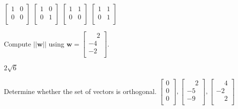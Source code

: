 \documentclass[11pt]{exam}
\begin{document}
\begin{questions}
\begin{oneparchoices}
\choice $\left[\begin{array}{cc}1 & 0 \\ 0 & 0 \\ \end{array}\right]$
\choice $\left[\begin{array}{cc}1 & 0 \\ 0 & 1 \\ \end{array}\right]$
\choice $\left[\begin{array}{cc}1 & 1 \\ 0 & 0 \\ \end{array}\right]$
\choice $\left[\begin{array}{cc}1 & 1 \\ 0 & 1 \\ \end{array}\right]$ %
\end{oneparchoices}
\answerline

\newpage
\addpoints
\question[2]
Compute $||\mathbf{w}||$ using $\mathbf{w}=\left[\begin{array}{c}\phantom{-}2 \\ -4 \\ -2 \\\end{array}\right]$.

\begin{oneparchoices}
\choice $2\sqrt{6}$ %
\end{oneparchoices}
\answerline

\addpoints
\question[2]
Determine whether the set of vectors is orthogonal. \newline
$\left[\begin{array}{c} 0 \\ 0 \\ 0 \\ \end{array}\right], \left[\begin{array}{c} \phantom{-}2 \\ -5 \\ -9 \\ \end{array}\right], \left[\begin{array}{c} \phantom{-}4 \\ -2 \\ \phantom{-}2 \\ \end{array}\right]$


\end{questions}
\end{document}

